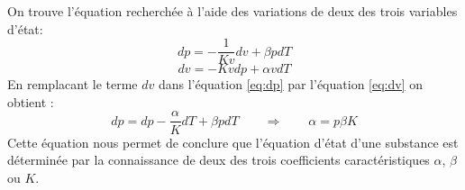 On trouve l'équation recherchée à l'aide des variations de deux des trois variables d'état: 
\begin{equation} dp = -\frac{1}{Kv}dv + \beta p dT \label{eq:dp}\end{equation}
\begin{equation} dv = -Kv dp +  \alpha v dT \label{eq:dv}\end{equation}
En remplacant le terme $dv$ dans l'équation \ref{eq:dp} par l'équation \ref{eq:dv} on obtient :
\begin{equation} dp = dp - \frac{\alpha}{K}dT + \beta p dT \qquad\Rightarrow\qquad \alpha = p\beta K\end{equation}
Cette équation nous permet de conclure que l'équation d'état d'une substance est déterminée par la connaissance de deux des trois coefficients caractéristiques $\alpha$, $\beta$ ou $K$.


